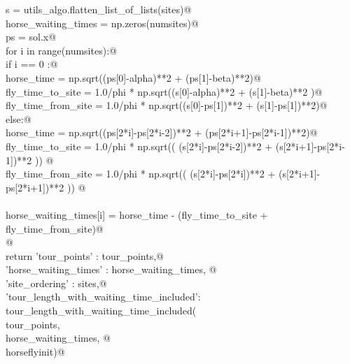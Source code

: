 \documentclass[11.5pt]{report}
\begin{document}
\begin{flushleft}
\begin{list}{}{}
\mbox{}\verb@    s                   = utils_algo.flatten_list_of_lists(sites)@\\
\mbox{}\verb@    horse_waiting_times = np.zeros(numsites)@\\
\mbox{}\verb@    ps                  = sol.x@\\
\mbox{}\verb@    for i in range(numsites):@\\
\mbox{}\verb@        if i == 0 :@\\
\mbox{}\verb@            horse_time         = np.sqrt((ps[0]-alpha)**2 + (ps[1]-beta)**2)@\\
\mbox{}\verb@            fly_time_to_site   = 1.0/phi * np.sqrt((s[0]-alpha)**2 + (s[1]-beta)**2 )@\\
\mbox{}\verb@            fly_time_from_site = 1.0/phi * np.sqrt((s[0]-ps[1])**2 + (s[1]-ps[1])**2)@\\
\mbox{}\verb@        else:@\\
\mbox{}\verb@            horse_time         = np.sqrt((ps[2*i]-ps[2*i-2])**2 + (ps[2*i+1]-ps[2*i-1])**2)@\\
\mbox{}\verb@            fly_time_to_site   = 1.0/phi * np.sqrt(( (s[2*i]-ps[2*i-2])**2 + (s[2*i+1]-ps[2*i-1])**2 )) @\\
\mbox{}\verb@            fly_time_from_site = 1.0/phi * np.sqrt(( (s[2*i]-ps[2*i])**2   + (s[2*i+1]-ps[2*i+1])**2 )) @\\
\mbox{}\verb@@\\
\mbox{}\verb@        horse_waiting_times[i] = horse_time - (fly_time_to_site + fly_time_from_site)@\\
\mbox{}\verb@    @\\
\mbox{}\verb@    return {'tour_points'                : tour_points,@\\
\mbox{}\verb@            'horse_waiting_times'        : horse_waiting_times, @\\
\mbox{}\verb@            'site_ordering'              : sites,@\\
\mbox{}\verb@            'tour_length_with_waiting_time_included': \@\\
\mbox{}\verb@                                       tour_length_with_waiting_time_included(\@\\
\mbox{}\verb@                                                    tour_points, \@\\
\mbox{}\verb@                                                    horse_waiting_times, @\\
\mbox{}\verb@                                                    horseflyinit)}@\\

\end{list}
\end{flushleft}
\end{document}
